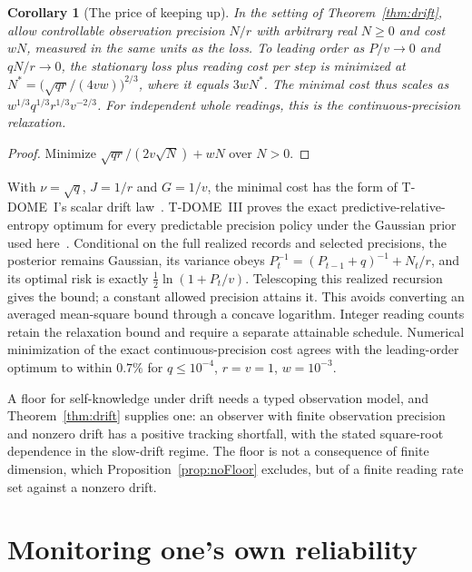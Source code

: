 \documentclass[12pt]{article}
\newtheorem{corollary}[theorem]{Corollary}
\theoremstyle{definition}
\theoremstyle{remark}
\begin{document}
\begin{corollary}[The price of keeping up]\label{cor:price}
In the setting of Theorem~\ref{thm:drift}, allow controllable observation precision $N/r$ with arbitrary real $N\ge0$ and cost $wN$, measured in the same units as the loss. To leading order as $P/v\to0$ and $qN/r\to0$, the stationary loss plus reading cost per step is minimized at $N^*=\bigl(\sqrt{qr}/(4vw)\bigr)^{2/3}$, where it equals $3wN^*$. The minimal cost thus scales as $w^{1/3}q^{1/3}r^{1/3}v^{-2/3}$. For independent whole readings, this is the continuous-precision relaxation.
\end{corollary}

\begin{proof}
Minimize $\sqrt{qr}/(2v\sqrt N)+wN$ over $N>0$.
\end{proof}

With $\nu=\sqrt q$, $J=1/r$ and $G=1/v$, the minimal cost has the form of T-DOME~I's scalar drift law~\cite{TDOMEI}. T-DOME~III proves the exact predictive-relative-entropy optimum for every predictable precision policy under the Gaussian prior used here~\cite{TDOMEIII}. Conditional on the full realized records and selected precisions, the posterior remains Gaussian, its variance obeys $P_t^{-1}=(P_{t-1}+q)^{-1}+N_t/r$, and its optimal risk is exactly $\tfrac12\ln(1+P_t/v)$. Telescoping this realized recursion gives the bound; a constant allowed precision attains it. This avoids converting an averaged mean-square bound through a concave logarithm. Integer reading counts retain the relaxation bound and require a separate attainable schedule. Numerical minimization of the exact continuous-precision cost agrees with the leading-order optimum to within $0.7\%$ for $q\le10^{-4}$, $r=v=1$, $w=10^{-3}$.

A floor for self-knowledge under drift needs a typed observation model, and Theorem~\ref{thm:drift} supplies one: an observer with finite observation precision and nonzero drift has a positive tracking shortfall, with the stated square-root dependence in the slow-drift regime. The floor is not a consequence of finite dimension, which Proposition~\ref{prop:noFloor} excludes, but of a finite reading rate set against a nonzero drift.

\section{Monitoring one's own reliability}\label{sec:monitor}
\end{document}
